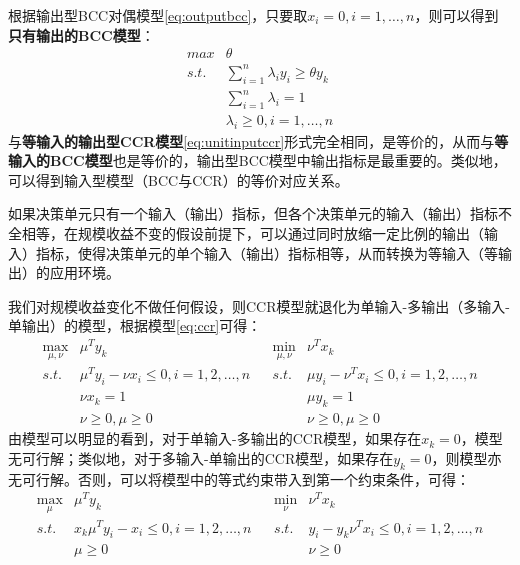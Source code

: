 根据输出型BCC对偶模型\eqref{eq:outputbcc}，只要取$x_i = 0, i = 1,\ldots, n$，则可以得到\textbf{只有输出的BCC模型}：
\begin{equation}\label{eq:bcconlyoutput}
\begin{array}{ll}
    \textit{max} & \theta\\
    \textit{s.t.} & \sum\limits_{i=1}^n \lambda_i y_i \ge \theta y_k\\
    & \sum\limits_{i=1}^n \lambda_i = 1\\
    & \lambda_i \ge 0,i = 1,\ldots, n
\end{array}
\end{equation}
与\textbf{等输入的输出型CCR模型}\eqref{eq:unitinputccr}形式完全相同，是等价的，从而与\textbf{等输入的BCC模型}也是等价的，输出型BCC模型中输出指标是最重要的。类似地，可以得到输入型模型（BCC与CCR）的等价对应关系。

如果决策单元只有一个输入（输出）指标，但各个决策单元的输入（输出）指标不全相等，在规模收益不变的假设前提下，可以通过同时放缩一定比例的输出（输入）指标，使得决策单元的单个输入（输出）指标相等，从而转换为等输入（等输出）的应用环境。

我们对规模收益变化不做任何假设，则CCR模型就退化为单输入-多输出（多输入-单输出）的模型，根据模型\eqref{eq:ccr}可得：
\begin{equation}\label{eq:one2multi-ccr}
\begin{array}{lllll}
  \max\limits_{\mu,\nu} & \mu^Ty_k & & \min\limits_{\mu,\nu} & \nu^T x_k\\
  \textit{s.t.} & \mu^Ty_i -\nu x_i \le 0, i=1,2,\dots,n & & \textit{s.t.} & \mu y_i -\nu^Tx_i \le 0, i=1,2,\dots,n \\
   & \nu x_k = 1 & & & \mu y_k = 1\\
   & \nu\geq 0, \mu\geq 0 & & & \nu\geq 0, \mu\geq 0
\end{array}
\end{equation}
由模型可以明显的看到，对于单输入-多输出的CCR模型，如果存在$x_k = 0$，模型无可行解；类似地，对于多输入-单输出的CCR模型，如果存在$y_k = 0$，则模型亦无可行解。否则，可以将模型中的等式约束带入到第一个约束条件，可得：
\begin{equation}\label{eq:degenerate-ccr}
\begin{array}{lllll}
  \max\limits_{\mu} & \mu^Ty_k & & \min\limits_{\nu} & \nu^T x_k\\
  \textit{s.t.} & x_k \mu^Ty_i - x_i \le 0, i=1,2,\dots,n & & \textit{s.t.} & y_i -y_k \nu^Tx_i \le 0, i=1,2,\dots,n \\
   & \mu\geq 0 & & & \nu\geq 0
\end{array}
\end{equation}

